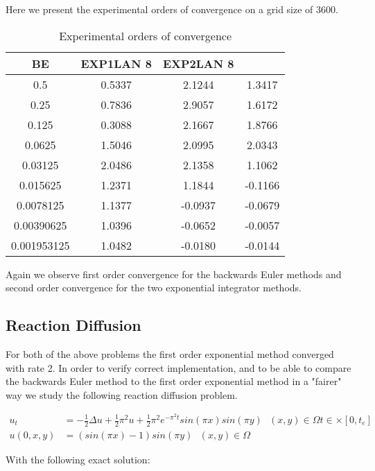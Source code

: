Here we present the experimental orders of convergence on a grid size of 3600.

\begin{table}[H]
    \centering
    \begin{tabular}{| c | c | c | c |}
    \hline
    BE & EXP1LAN 8 & EXP2LAN 8 \\
    \hline
    0.5 & 0.5337 & 2.1244    & 1.3417 \\
    0.25 & 0.7836 & 2.9057    & 1.6172 \\
    0.125 & 0.3088 & 2.1667   & 1.8766 \\
    0.0625 & 1.5046  & 2.0995   & 2.0343 \\
    0.03125 & 2.0486 & 2.1358     & 1.1062 \\
    0.015625 & 1.2371  & 1.1844    & -0.1166 \\
    0.0078125 & 1.1377 & -0.0937 & -0.0679 \\
    0.00390625 & 1.0396 & -0.0652 & -0.0057 \\
    0.001953125 & 1.0482 & -0.0180 & -0.0144 \\
    \hline
    \end{tabular}
    \caption{Experimental orders of convergence}
    \label{tab:reduced_data}
\end{table}

Again we observe first order convergence for the backwards Euler methods and second order convergence for the two exponential integrator methods.

\subsection{Reaction Diffusion}

For both of the above problems the first order exponential method converged with rate 2.
In order to verify correct implementation, and to be able to compare the backwards Euler method to the first order exponential method in a "fairer" way we study the following reaction diffusion problem\cite{Huang2022}.

\begin{align*}
    u_t &= -\frac12\Delta u + \frac12 \pi^2u + \frac12 \pi^2 e^{-\pi^2t}sin(\pi x)sin(\pi y) \text{ } (x,y)\in\Omega t\in\times[0,t_e]\\
    u(0,x,y) &= (sin(\pi x) - 1)sin(\pi y) \text{ } (x,y)\in \Omega
\end{align*}

With the following exact solution:

